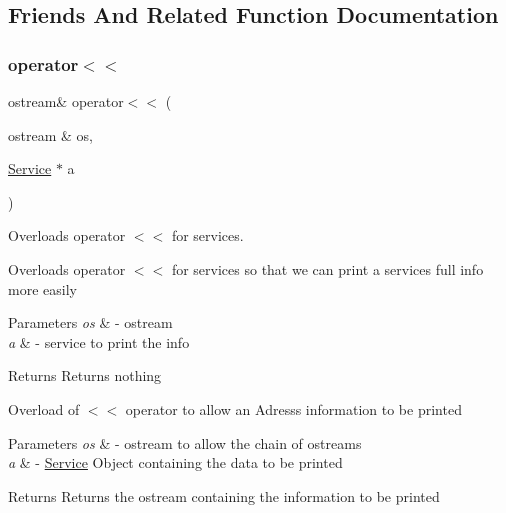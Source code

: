 \subsection{Friends And Related Function Documentation}
\mbox{\label{class_service_a641fd7efe1dd35ea19ac062c4e2ece45}} 
\subsubsection{\texorpdfstring{operator$<$$<$}{operator<<}}
{\footnotesize\ttfamily ostream\& operator$<$$<$ (\begin{DoxyParamCaption}\item[{ostream \&}]{os,  }\item[{\hyperlink{class_service}{Service} $\ast$}]{a }\end{DoxyParamCaption})\hspace{0.3cm}{\ttfamily [friend]}}



Overloads operator $<$$<$ for services. 

Overloads operator $<$$<$ for services so that we can print a service\textquotesingle{}s full info more easily


\begin{DoxyParams}{Parameters}
{\em os} & -\/ ostream \\
\hline
{\em a} & -\/ service to \textquotesingle{}print\textquotesingle{} the info \\
\hline
\end{DoxyParams}
\begin{DoxyReturn}{Returns}
Returns nothing
\end{DoxyReturn}
Overload of $<$$<$ operator to allow an Adress\textquotesingle{}s information to be printed


\begin{DoxyParams}{Parameters}
{\em os} & -\/ ostream to allow the chain of ostreams \\
\hline
{\em a} & -\/ \hyperlink{class_service}{Service} Object containing the data to be printed \\
\hline
\end{DoxyParams}
\begin{DoxyReturn}{Returns}
Returns the ostream containing the information to be printed 
\end{DoxyReturn}


